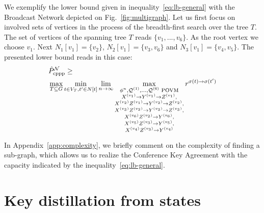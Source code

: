 \documentclass[aps,pra,twocolumn,superscriptaddress,longbibliography]{revtex4-1}
\newcommand{\mc}[1]{\mathcal{#1}}
\begin{document}
We exemplify the lower bound given in inequality~\eqref{eq:lb-general} with the Broadcast Network depicted on Fig.~\ref{fig:multigraph}. Let us first
focus on involved sets of vertices in the process of the breadth-first search over the tree $T$. The set of vertices of the spanning tree $T$ reads $\{v_1,...,v_6\}$. As the root vertex we choose $v_1$. Next $N_1[v_1] =\{v_2\}$, $N_2[v_1] =\{v_3,v_6\}$ and $N_3[v_1] =\{v_4,v_5\}$.
The presented lower bound reads in this case:
 \begin{align}
&\hat{P}_{\textnormal{cppp}}^{\mc{N}}\geq \nonumber
\\
&\max_{T\subseteq G}\min_{t\in V_T,t'\in N[t]} \lim_{n\to\infty}
\max_{\substack{\phi^n,\mc{Q}^{(1)},...,\mc{Q}^{(6)}\text{ POVM}\\X^{(v_1)}\to Y^{(v_1)}\to Z^{(v_1)},\\
        X^{(v_2)}Z^{(v_1)}\to Y^{(v_2)}\to Z^{(v_2)},\\
        X^{(v_3)}Z^{(v_2)}\to Y^{(v_3)}\to Z^{(v_3)},\\
            X^{(v_6)}Z^{(v_2)}\to Y^{(v_6)},\\
                X^{(v_5)}Z^{(v_3)}\to Y^{(v_5)},\\
                    X^{(v_4)}Z^{(v_3)}\to Y^{(v_4)}}}  r^{\sigma(t) \to \sigma(t')}
\label{eq:lb-example}
\end{align}

In Appendix~\ref{app:complexity}, we briefly comment on the complexity of finding a sub-graph, which allows us to realize the
Conference Key Agreement with the capacity indicated by the inequality~\eqref{eq:lb-general}.

\section{Key distillation from states} \label{sec:dist-state}
\end{document}
